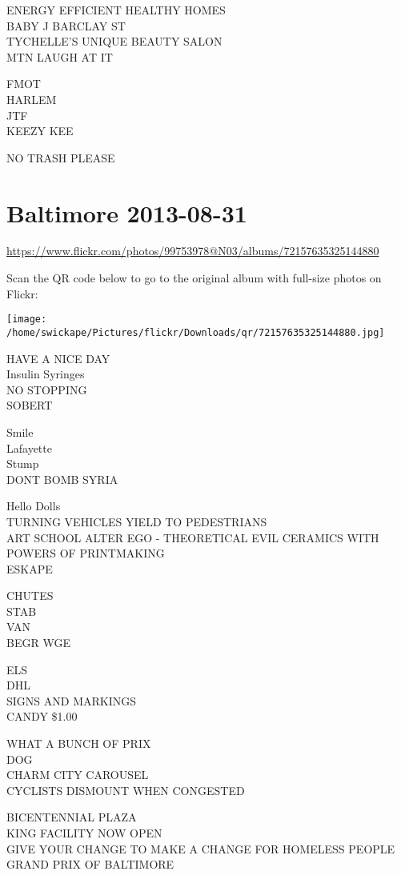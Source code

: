 \documentclass[10pt,letterpaper]{article}
\begin{document}
ENERGY EFFICIENT HEALTHY HOMES\\
BABY J BARCLAY ST\\
TYCHELLE'S UNIQUE BEAUTY SALON\\
MTN LAUGH AT IT

FMOT\\
HARLEM\\
JTF\\
KEEZY KEE

NO TRASH PLEASE


\section*{Baltimore 2013-08-31}

\url{https://www.flickr.com/photos/99753978@N03/albums/72157635325144880}

Scan the QR code below to go to the original album with full-size photos on Flickr:

\texttt{[image: /home/swickape/Pictures/flickr/Downloads/qr/72157635325144880.jpg]}


HAVE A NICE DAY\\
Insulin Syringes\\
NO STOPPING\\
SOBERT

Smile\\
Lafayette\\
Stump\\
DONT BOMB SYRIA

Hello Dolls\\
TURNING VEHICLES YIELD TO PEDESTRIANS\\
ART SCHOOL ALTER EGO {-} THEORETICAL EVIL CERAMICS WITH POWERS OF PRINTMAKING\\
ESKAPE

CHUTES\\
STAB\\
VAN\\
BEGR WGE

ELS\\
DHL\\
SIGNS AND MARKINGS\\
CANDY \$1.00

WHAT A BUNCH OF PRIX\\
DOG\\
CHARM CITY CAROUSEL\\
CYCLISTS DISMOUNT WHEN CONGESTED

BICENTENNIAL PLAZA\\
KING FACILITY NOW OPEN\\
GIVE YOUR CHANGE TO MAKE A CHANGE FOR HOMELESS PEOPLE\\
GRAND PRIX OF BALTIMORE
\end{document}
